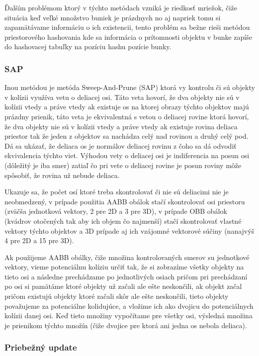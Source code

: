 \documentclass[a4paper]{article}
\begin{document}
	Ďalším problémom ktorý v týchto metódach vzniká je riedkosť mriežok, čiže situácia keď veľké množstvo buniek je prázdnych no aj napriek tomu si zapamätávame informáciu o ich existencii, tento problém sa bežne rieši metódou priestorového hashovania kde sa informácia o prítomnosti objektu v bunke zapíše do hashovacej tabuľky na pozíciu hashu pozície bunky.
	
	\subsubsection{SAP}
	
	Inou metódou je metóda Sweep-And-Prune (SAP) ktorá vy kontrolu či sú objekty v kolízii využíva vetu o deliacej osi. Táto veta hovorí, že dva objekty nie sú v kolízii vtedy a práve vtedy ak existuje os na ktorej obrazy týchto objektov majú prázdny prienik, táto veta je ekvivalentná s vetou o deliacej rovine ktorá hovorí, že dva objekty nie sú v kolízii vtedy a práve vtedy ak existuje rovina deliaca priestor tak že jeden z objektov sa nachádza celý nad rovinou a druhý celý pod. Dá sa ukázať, že deliaca os je normálov deliacej rovinu z čoho sa dá odvodiť ekvivalencia týchto viet. Výhodou vety o deliacej osi je indiferencia na posun osi (dôležitý je iba smer) zatiaľ čo pri vete o deliacej rovine je posun roviny môže spôsobiť, že rovina už nebude deliaca. 
	
	Ukazuje sa, že počet osí ktoré treba skontrolovať či nie sú deliacimi nie je neobmedzený, v prípade použitia AABB obálok stačí skontrolovať osi priestoru (zväčša jednotková vektory, 2 pre 2D a 3 pre 3D), v prípade OBB obálok (kvádrov otočených tak aby ich objem čo najmenší) stačí skontrolovať vlastné vektory týchto objektov a 3D prípade aj ich vzájomné vektorové súčiny (nanajvýš 4 pre 2D a 15 pre 3D).
	
	Ak použijeme AABB obálky, čiže množina kontrolovaných smerov su jednotkové vektory, vieme potenciálnu kolíziu určiť tak, že si zobrazíme všetky objekty na tieto osi a následne prechádzame po jednotlivých osiach pričom pri prechádzaní po osi si pamätáme ktoré objekty už začali ale ešte neskončili, ak objekt začal pričom existujú objekty ktoré začali skôr ale ešte neskončili, tieto objekty považujeme za potenciálne kolidujúce, a vložime ich ako dvojicu do potenciálnych kolízii danej osi. Keď tieto množiny vypočítame pre všetky osi, výsledná množina je prienikom týchto množín (čiže dvojice pre ktorá ani jedna os nebola deliaca).
	
	\subsubsection{Priebežný update}
	
\end{document}
